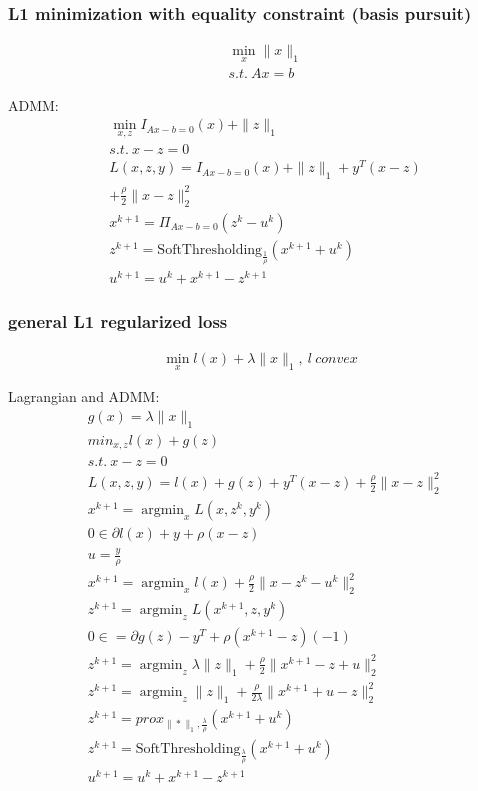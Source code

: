 \documentclass[8pt]{extarticle}
\DeclareMathOperator*{\argmin}{argmin}
\newcommand{\norm}[1]{\|#1\|}
\begin{document}
\begin{multicols*}{2}
  \subsubsection{L1 minimization with equality constraint (basis pursuit)}
  \begin{align*}
    &\min_x \norm{x}_1\\
    &s.t.\ Ax=b
  \end{align*}

  ADMM:
  \begin{align*}
    &\min_{x,z} I_{Ax-b=0}(x) + \norm{z}_1\\
    &s.t.\ x - z = 0\\
    &L(x,z,y) = I_{Ax-b=0}(x) + \norm{z}_1 + y^T(x-z)\\
    &+ \frac{\rho}{2}\norm{x-z}_2^2\\
    &x^{k+1} = \Pi_{Ax-b=0}(z^k-u^k)\\
    &z^{k+1} = \text{SoftThresholding}_{\frac{1}{\rho}}(x^{k+1}+u^k)\\
    &u^{k+1} = u^k + x^{k+1} - z^{k+1}
  \end{align*}
  
  \vfill\null
  \columnbreak

  \subsubsection{general L1 regularized loss}
  \begin{align*}
    \min_x l(x) + \lambda \norm{x}_1,\ l\ convex
  \end{align*}

  Lagrangian and ADMM:
  \begin{align*}
    &g(x)=\lambda \norm{x}_1\\
    &min_{x,z} l(x) + g(z)\\
    &s.t.\ x-z=0\\
    &L(x,z,y) = l(x) + g(z) + y^T (x-z)+\frac{\rho}{2}\norm{x-z}_2^2\\
    &x^{k+1}=\argmin_x L(x, z^k, y^k)\\
    &0 \in \partial l(x) + y + \rho(x-z)\\
    &u=\frac{y}{\rho}\\
    &x^{k+1}=\argmin_x l(x) + \frac{\rho}{2}\norm{x-z^k-u^k}_2^2\\
    &z^{k+1}=\argmin_z L(x^{k+1}, z, y^k)\\
    &0 \in = \partial g(z) - y^T + \rho (x^{k+1}-z)(-1)\\
    &z^{k+1}=\argmin_z \lambda \norm{z}_1 + \frac{\rho}{2}\norm{x^{k+1}-z+u}_2^2\\
    &z^{k+1}=\argmin_z \norm{z}_1 + \frac{\rho}{2\lambda}\norm{x^{k+1}+u-z}_2^2\\
    &z^{k+1}=prox_{\norm{*}_1, \frac{\lambda}{\rho}}(x^{k+1}+u^k)\\
    &z^{k+1}=\text{SoftThresholding}_{\frac{\lambda}{\rho}}(x^{k+1}+u^k)\\
    &u^{k+1} = u^k + x^{k+1} - z^{k+1}
  \end{align*}


\end{multicols*}
\end{document}
